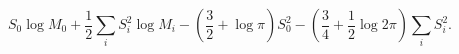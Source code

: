 \begin{equation}
S_{0}\log M_{0}+\frac{1}{2}\sum_{i}S_{i}^{2}\log M_{i}-\left( \frac{3}{2}%
+\log \pi \right) S_{0}^{2}-\left( \frac{3}{4}+\frac{1}{2}\log 2\pi \right)
\sum_{i}S_{i}^{2}.
\end{equation}


